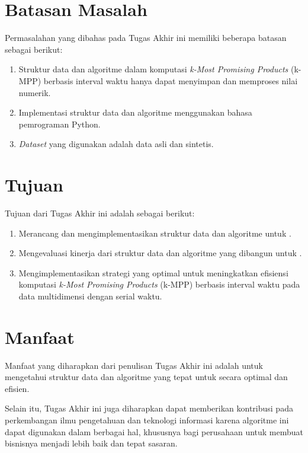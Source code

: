 \section{Batasan Masalah}
\tab Permasalahan yang dibahas pada Tugas Akhir ini memiliki beberapa batasan sebagai berikut:
\begin{enumerate}
	\item Struktur data dan algoritme dalam komputasi \textit{k-Most Promising Products} (k-MPP) berbasis interval waktu hanya dapat menyimpan dan memproses nilai numerik.
	\item Implementasi struktur data dan algoritme menggunakan bahasa pemrograman Python.
	\item \textit{Dataset} yang digunakan adalah data asli dan sintetis.
\end{enumerate}

\section{Tujuan}
\tab Tujuan dari Tugas Akhir ini adalah sebagai berikut:

\begin{enumerate}
	\item Merancang dan mengimplementasikan struktur data dan algoritme untuk \problemm.
	\item Mengevaluasi kinerja dari struktur data dan algoritme yang dibangun untuk \problemm.
	\pagebreak
	\item Mengimplementasikan strategi yang optimal untuk meningkatkan efisiensi komputasi \textit{k-Most Promising Products} (k-MPP) berbasis interval waktu pada data multidimensi dengan serial waktu.
\end{enumerate}

\section{Manfaat}
\tab Manfaat yang diharapkan dari penulisan Tugas Akhir ini adalah untuk mengetahui struktur data dan algoritme yang tepat untuk \problemm secara optimal dan efisien.

Selain itu, Tugas Akhir ini juga diharapkan dapat memberikan kontribusi pada perkembangan ilmu pengetahuan dan teknologi informasi karena algoritme ini dapat digunakan dalam berbagai hal, khususnya bagi perusahaan untuk membuat bisnisnya menjadi lebih baik dan tepat sasaran.

